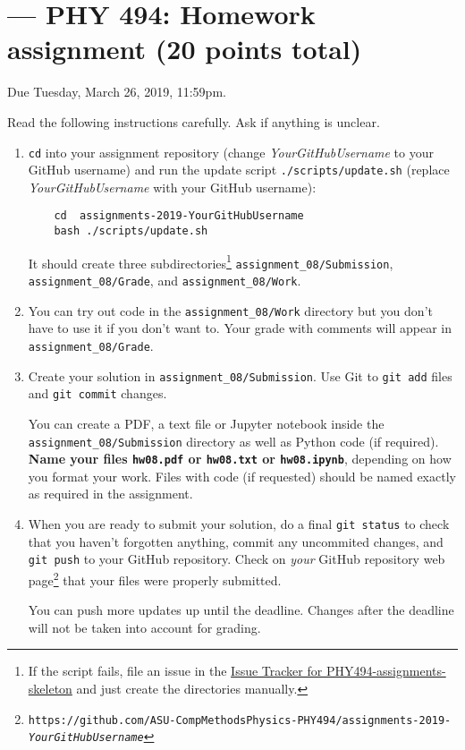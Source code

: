 \documentclass[letterpaper]{scrartcl}
\newcommand{\anumber}{8}
\newcommand{\anum}{0\anumber}
\begin{document}

\setcounter{section}{\anumber}
\addtocounter{section}{-1}
\section{ --- PHY 494: Homework assignment (20 points total)}

\noindent Due Tuesday, March 26, 2019, 11:59pm.

\noindent
Read the following instructions carefully. Ask if anything is unclear.
\begin{enumerate}
\item \texttt{cd} into your assignment repository (change
  \emph{YourGitHubUsername} to your GitHub username) and run the
  update script \texttt{./scripts/update.sh} (replace
  \emph{YourGitHubUsername} with your GitHub username):
  \begin{verbatim}
    cd  assignments-2019-YourGitHubUsername
    bash ./scripts/update.sh
  \end{verbatim}
  It should create three subdirectories\footnote{If the script fails,
    file an issue in the
    \href{https://github.com/ASU-CompMethodsPhysics-PHY494/PHY494-assignments-skeleton/issues}{Issue
      Tracker for PHY494-assignments-skeleton} and just create the
    directories manually.} \texttt{assignment\_\anum/Submission},
  \texttt{assignment\_\anum/Grade}, and
  \texttt{assignment\_\anum/Work}.
\item You can try out code in the \texttt{assignment\_\anum/Work}
  directory but you don't have to use it if you don't want to. Your
  grade with comments will appear in
  \texttt{assignment\_\anum/Grade}.
\item Create your solution in
  \texttt{assignment\_\anum/Submission}. Use Git to \texttt{git
    add} files and \texttt{git commit} changes.

  You can create a PDF, a text file or Jupyter notebook inside the
  \texttt{assignment\_\anum/Submission} directory as well as Python
  code (if required). \textbf{Name your files \texttt{hw\anum.pdf} or
    \texttt{hw\anum.txt} or \texttt{hw\anum.ipynb}}, depending on how
  you format your work. Files with code (if requested) should be named
  exactly as required in the assignment.
\item When you are ready to submit your solution, do a final
  \texttt{git status} to check that you haven't forgotten anything,
  commit any uncommited changes, and \texttt{git push} to your GitHub
  repository. Check on \emph{your} GitHub repository web
  page\footnote{\texttt{https://github.com/ASU-CompMethodsPhysics-PHY494/assignments-2019-\emph{YourGitHubUsername}}}
  that your files were properly submitted.

  You can push more updates up until the deadline. Changes after the
  deadline will not be taken into account for grading.
\end{enumerate}
\end{document}
